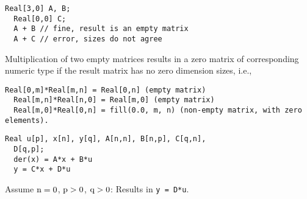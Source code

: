 \begin{lstlisting}[language=modelica]
  Real[3,0] A, B;
  Real[0,0] C;
  A + B // fine, result is an empty matrix
  A + C // error, sizes do not agree
\end{lstlisting}
Multiplication of two empty matrices results in a zero matrix of
corresponding numeric type if the result matrix has no zero dimension
sizes, i.e.,

\begin{lstlisting}[language=modelica]
  Real[0,m]*Real[m,n] = Real[0,n] (empty matrix)
  Real[m,n]*Real[n,0] = Real[m,0] (empty matrix)
  Real[m,0]*Real[0,n] = fill(0.0, m, n) (non-empty matrix, with zero elements).
\end{lstlisting}

\begin{example}
\begin{lstlisting}[language=modelica]
  Real u[p], x[n], y[q], A[n,n], B[n,p], C[q,n],
  D[q,p];
  der(x) = A*x + B*u
  y = C*x + D*u
\end{lstlisting}
Assume $\text{\lstinline!n!} = 0$, $\text{\lstinline!p!} > 0$, $\text{\lstinline!q!} > 0$: Results in \lstinline!y = D*u!.
\end{example}
